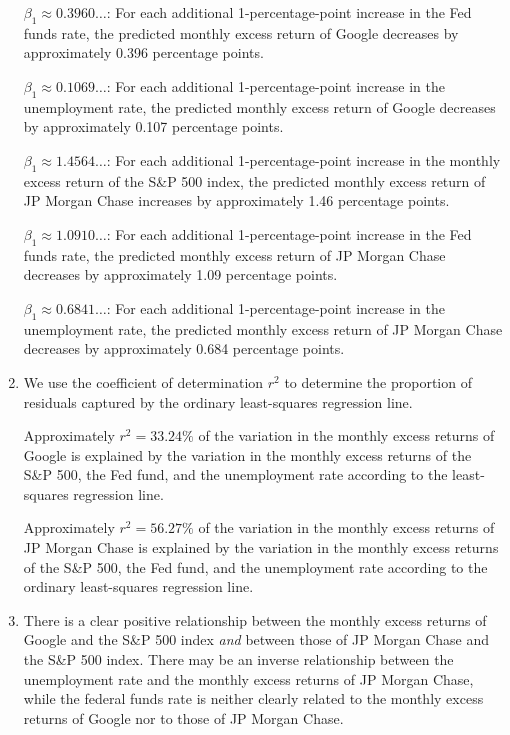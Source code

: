 \documentclass[12pt]{article}
\begin{document}
\begin{enumerate}
$\beta_1\approx 0.3960\dots$: For each additional 1-percentage-point increase in the Fed funds rate, the predicted monthly excess return of Google decreases by approximately 0.396 percentage points.

$\beta_1\approx 0.1069\dots$: For each additional 1-percentage-point increase in the unemployment rate, the predicted monthly excess return of Google decreases by approximately 0.107 percentage points.
\newline

$\beta_1\approx 1.4564\dots$: For each additional 1-percentage-point increase in the monthly excess return of the S\&P 500 index, the predicted monthly excess return of JP Morgan Chase increases by approximately 1.46 percentage points.

$\beta_1\approx 1.0910\dots$: For each additional 1-percentage-point increase in the Fed funds rate, the predicted monthly excess return of JP Morgan Chase decreases by approximately 1.09 percentage points.

$\beta_1\approx 0.6841\dots$: For each additional 1-percentage-point increase in the unemployment rate, the predicted monthly excess return of JP Morgan Chase decreases by approximately 0.684 percentage points.
\item We use the coefficient of determination $r^2$ to determine the proportion of residuals captured by the ordinary least-squares regression line.

Approximately $r^2=33.24\%$ of the variation in the monthly excess returns of Google is explained by the variation in the monthly excess returns of the S\&P 500, the Fed fund, and the unemployment rate according to the least-squares regression line.

Approximately $r^2=56.27\%$ of the variation in the monthly excess returns of JP Morgan Chase is explained by the variation in the monthly excess returns of the S\&P 500, the Fed fund, and the unemployment rate according to the ordinary least-squares regression line.
\item There is a clear positive relationship between the monthly excess returns of Google and the S\&P 500 index \textit{and} between those of JP Morgan Chase and the S\&P 500 index. There may be an inverse relationship between the unemployment rate and the monthly excess returns of JP Morgan Chase, while the federal funds rate is neither clearly related to the monthly excess returns of Google nor to those of JP Morgan Chase.
\end{enumerate}
\end{document}
